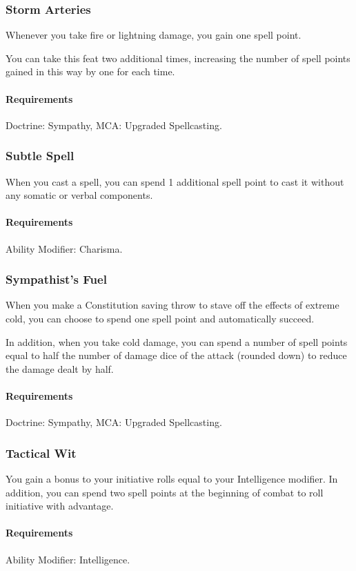 \subsubsection{Storm Arteries} \label{feat::stormarteries}
    Whenever you take fire or lightning damage, you gain one spell point.

    You can take this feat two additional times, increasing the number of spell points gained in this way by one for each time.
    \paragraph{Requirements} Doctrine: Sympathy, MCA: Upgraded Spellcasting.
\subsubsection{Subtle Spell} \label{feat::subtlespell}
    When you cast a spell, you can spend 1 additional spell point to cast it without any somatic or verbal components.
    \paragraph{Requirements} Ability Modifier: Charisma.
\subsubsection{Sympathist's Fuel} \label{feat::sympathistsfuel}
    When you make a Constitution saving throw to stave off the effects of extreme cold, you can choose to spend one spell point and automatically succeed.

    In addition, when you take cold damage, you can spend a number of spell points equal to half the number of damage dice of the attack (rounded down) to reduce the damage dealt by half.
    \paragraph{Requirements} Doctrine: Sympathy, MCA: Upgraded Spellcasting.
\subsubsection{Tactical Wit} \label{feat::tacticalwit}
    You gain a bonus to your initiative rolls equal to your Intelligence modifier.
    In addition, you can spend two spell points at the beginning of combat to roll initiative with advantage.
    \paragraph{Requirements} Ability Modifier: Intelligence.
